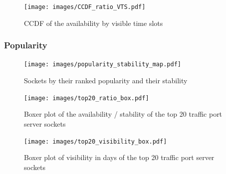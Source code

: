 \begin{landscape}
\begin{figure}
	[ht] \centering 
	\texttt{[image: images/CCDF\_ratio\_VTS.pdf]}
	\caption{CCDF of the availability by visible time slots} 
	\label{fig:ccdf_ratio_vts} 
\end{figure}
\end{landscape}

\subsubsection{Popularity}
\begin{figure}
	[ht] \centering 
	\texttt{[image: images/popularity\_stability\_map.pdf]}
	\caption{Sockets by their ranked popularity and their stability} 
	\label{fig:rankedPopularity} 
\end{figure}


\begin{landscape}
\begin{figure}
	[ht] \centering 
	\texttt{[image: images/top20\_ratio\_box.pdf]}
	\caption{Boxer plot of the availability / stability of the top 20 traffic port server sockets} 
	\label{fig:top20_ratio_box} 
\end{figure}
\end{landscape}

\begin{landscape}
\begin{figure}
	[ht] \centering 
	\texttt{[image: images/top20\_visibility\_box.pdf]}
	\caption{Boxer plot of visibility in days of the top 20 traffic port server sockets}
	\label{fig:top20_visibledays_box}
\end{figure}
\end{landscape}


